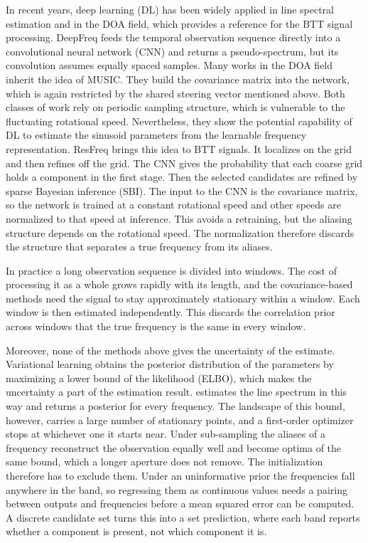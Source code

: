 \documentclass[journal,onecolumn]{IEEEtran}
\begin{document}
In recent years, deep learning (DL) has been widely applied in line spectral estimation and in the DOA field, which provides a reference for the BTT signal processing. DeepFreq\cite{izacard_data-driven_2021} feeds the temporal observation sequence directly into a convolutional neural network (CNN) and returns a pseudo-spectrum, but its convolution assumes equally spaced samples. Many works in the DOA field inherit the idea of MUSIC. They build the covariance matrix into the network\cite{Merkofer_Deep_2022}\cite{weiser_unsupervised_2023}, which is again restricted by the shared steering vector mentioned above. Both classes of work rely on periodic sampling structure, which is vulnerable to the fluctuating rotational speed. Nevertheless, they show the potential capability of DL to estimate the sinusoid parameters from the learnable frequency representation. ResFreq\cite{jin_deep_2026} brings this idea to BTT signals. It localizes on the grid and then refines off the grid. The CNN gives the probability that each coarse grid holds a component in the first stage. Then the selected candidates are refined by sparse Bayesian inference (SBI). The input to the CNN is the covariance matrix, so the network is trained at a constant rotational speed and other speeds are normalized to that speed at inference. This avoids a retraining, but the aliasing structure depends on the rotational speed. The normalization therefore discards the structure that separates a true frequency from its aliases.

In practice a long observation sequence is divided into windows. The cost of processing it as a whole grows rapidly with its length, and the covariance-based methods need the signal to stay approximately stationary within a window. Each window is then estimated independently. This discards the correlation prior across windows that the true frequency is the same in every window\cite{elkhabbazi2026sliding}\cite{guida_bayesian_nodate}.

Moreover, none of the methods above gives the uncertainty of the estimate. Variational learning obtains the posterior distribution of the parameters by maximizing a lower bound of the likelihood (ELBO), which makes the uncertainty a part of the estimation result. \cite{badiu_variational_2017} estimates the line spectrum in this way and returns a posterior for every frequency. The landscape of this bound, however, carries a large number of stationary points, and a first-order optimizer stops at whichever one it starts near\cite{guo_unsupervised_2023}. Under sub-sampling the aliases of a frequency reconstruct the observation equally well and become optima of the same bound, which a longer aperture does not remove\cite{guo_unsupervised_2023}. The initialization therefore has to exclude them. Under an uninformative prior the frequencies fall anywhere in the band, so regressing them as continuous values needs a pairing between outputs and frequencies before a mean squared error can be computed. A discrete candidate set turns this into a set prediction, where each band reports whether a component is present, not which component it is.
\end{document}
